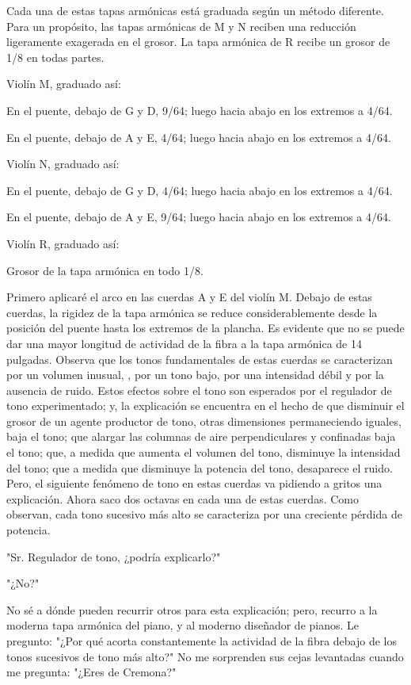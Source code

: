 \documentclass[12pt]{book}
\begin{document}
Cada una de estas tapas armónicas está graduada según un método diferente. Para un propósito, las tapas armónicas de M y N reciben una reducción ligeramente exagerada en el grosor. La tapa armónica de R recibe un grosor de 1/8 en todas partes.

Violín M, graduado así:

En el puente, debajo de G y D, 9/64; luego hacia abajo en los extremos a 4/64.

En el puente, debajo de A y E, 4/64; luego hacia abajo en los extremos a 4/64.

Violín N, graduado así:

En el puente, debajo de G y D, 4/64; luego hacia abajo en los extremos a 4/64.

En el puente, debajo de A y E, 9/64; luego hacia abajo en los extremos a 4/64.

Violín R, graduado así:

Grosor de la tapa armónica en todo 1/8.

Primero aplicaré el arco en las cuerdas A y E del violín M. Debajo de estas cuerdas, la rigidez de la tapa armónica se reduce considerablemente desde la posición del puente hasta los extremos de la plancha. Es evidente que no se puede dar una mayor longitud de actividad de la fibra a la tapa armónica de 14 pulgadas. Observa que los tonos fundamentales de estas cuerdas se caracterizan por un volumen inusual, , por un tono bajo, por una intensidad débil y por la ausencia de ruido. Estos efectos sobre el tono son esperados por el regulador de tono experimentado; y, la explicación se encuentra en el hecho de que disminuir el grosor de un agente productor de tono, otras dimensiones permaneciendo iguales, baja el tono; que alargar las columnas de aire perpendiculares y confinadas baja el tono; que, a medida que aumenta el volumen del tono, disminuye la intensidad del tono; que a medida que disminuye la potencia del tono, desaparece el ruido. Pero, el siguiente fenómeno de tono en estas cuerdas va pidiendo a gritos una explicación. Ahora saco dos octavas en cada una de estas cuerdas. Como observan, cada tono sucesivo más alto se caracteriza por una creciente pérdida de potencia.

"Sr. Regulador de tono, ¿podría explicarlo?"

"¿No?"

No sé a dónde pueden recurrir otros para esta explicación; pero, recurro a la moderna tapa armónica del piano, y al moderno diseñador de pianos. Le pregunto: "¿Por qué acorta constantemente la actividad de la fibra debajo de los tonos sucesivos de tono más alto?" No me sorprenden sus cejas levantadas cuando me pregunta: "¿Eres de Cremona?"
\end{document}
